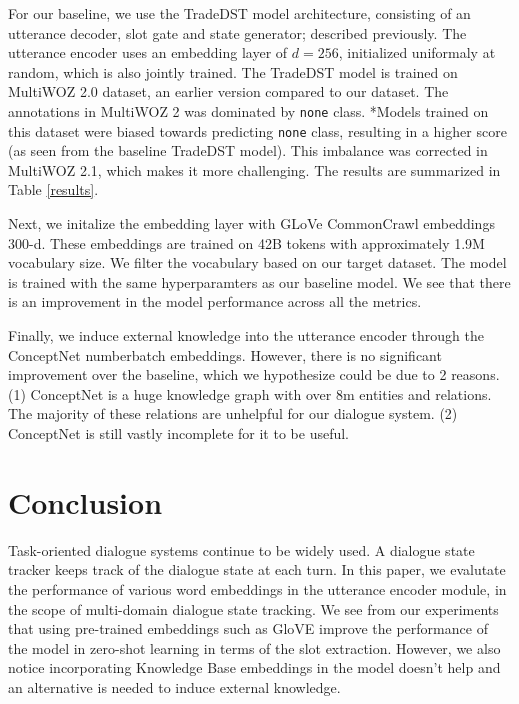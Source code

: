 \documentclass[12pt,a4paper]{article}
\begin{document}
For our baseline, we use the TradeDST model architecture, consisting of an utterance decoder, slot gate and state generator; described previously. The utterance encoder uses an embedding layer of $d = 256$, initialized uniformaly at random, which is also jointly trained. The TradeDST model is trained on MultiWOZ 2.0 dataset, an earlier version compared to our dataset. The annotations in MultiWOZ 2 was dominated by \texttt{none} class. *Models trained on this dataset were biased towards predicting \texttt{none} class, resulting in a higher score (as seen from the baseline TradeDST model). This imbalance was corrected in MultiWOZ 2.1, which makes it more challenging. The results are summarized in Table \ref{results}.

Next, we initalize the embedding layer with GLoVe CommonCrawl embeddings $300$-d. These embeddings are trained on 42B tokens with approximately 1.9M vocabulary size. We filter the vocabulary based on our target dataset. The model is trained with the same hyperparamters as our baseline model. We see that there is an improvement in the model performance across all the metrics.

Finally, we induce external knowledge into the utterance encoder through the ConceptNet numberbatch embeddings. However, there is no significant improvement over the baseline, which we hypothesize could be due to 2 reasons. (1) ConceptNet is a huge knowledge graph with over 8m entities and relations. The majority of these relations are unhelpful for our dialogue system. (2) ConceptNet is still vastly incomplete for it to be useful.

\section{Conclusion}

Task-oriented dialogue systems continue to be widely used. A dialogue state tracker keeps track of the dialogue state at each turn. In this paper, we evalutate the performance of various word embeddings in the utterance encoder module, in the scope of multi-domain dialogue state tracking. We see from our experiments that using pre-trained embeddings such as GloVE improve the performance of the model in zero-shot learning in terms of the slot extraction. However, we also notice incorporating Knowledge Base embeddings in the model doesn't help and an alternative is needed to induce external knowledge.

\nocite{*}

\end{document}

